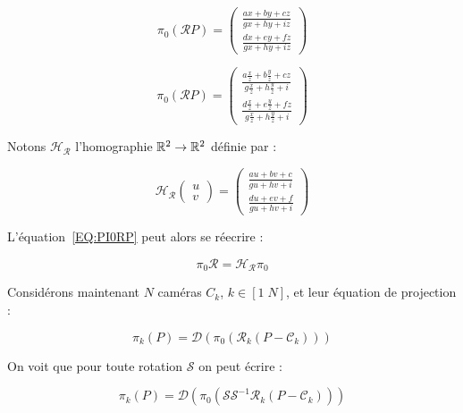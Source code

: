 \begin{equation}
   \pi_0(\mathcal{R} P) =
    \begin{pmatrix} \frac{ax+by+cz}{gx+hy+iz} \\ \frac{dx+ey+fz}{gx+hy+iz}  \end{pmatrix}
\end{equation}

\begin{equation}
   \pi_0(\mathcal{R} P) =\begin{pmatrix} 
                 \frac{a\frac{x}{z}+b\frac{y}{z}+cz}{g\frac{x}{z}+h\frac{y}{z}+i} \\
                 \frac{d\frac{x}{z}+e\frac{y}{z}+fz}{g\frac{x}{z}+h\frac{y}{z}+i} 
               \end{pmatrix}
   \label{EQ:PI0RP}
\end{equation}

Notons $\mathcal{H_R}$ l'homographie $\RR^2 \rightarrow \RR^2$ d\'efinie par :


\begin{equation}
   \mathcal{H_R}\begin{pmatrix}u\\v\end{pmatrix}  
               =\begin{pmatrix} \frac{au+bv+c}{gu+hv+i} \\ \frac{du+ev+f}{gu+hv+i}  \end{pmatrix}
\end{equation}

L'\'equation~\ref{EQ:PI0RP} peut alors se r\'eecrire :

\begin{equation}
   \pi_0 \mathcal{R} = \mathcal{H_R} \pi_0
\end{equation}

Consid\'erons maintenant $N$ cam\'eras $C_k$, $ k\in [1\; N]$, et  leur \'equation de projection :

\begin{equation}
   \pi_k(P) =   \mathcal{D}(\pi_0(\mathcal{R}_k(P-\mathcal{C}_k)))
  \label{EQ:PROJ:NON:AMB}
\end{equation}

On voit que pour toute rotation $\mathcal{S}$ on peut \'ecrire :

\begin{equation}
   \pi_k(P) =   \mathcal{D}(\pi_0(\mathcal{S S}^{-1}\mathcal{R}_k(P-\mathcal{C}_k)))
\end{equation}

